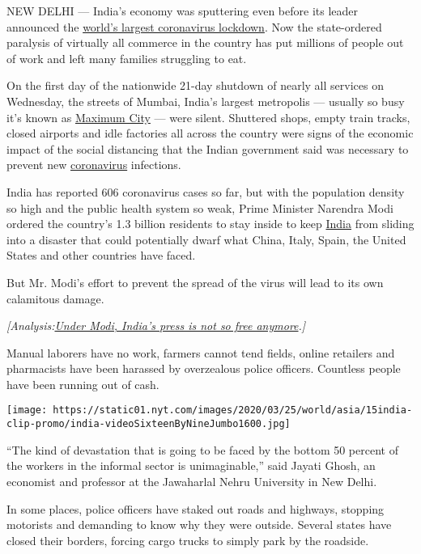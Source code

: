 NEW DELHI --- India's economy was sputtering even before its leader
announced the
\href{https://www.nytimes.com/2020/03/24/world/asia/india-coronavirus-lockdown.html}{world's
largest coronavirus lockdown}. Now the state-ordered paralysis of
virtually all commerce in the country has put millions of people out of
work and left many families struggling to eat.

On the first day of the nationwide 21-day shutdown of nearly all
services on Wednesday, the streets of Mumbai, India's largest metropolis
--- usually so busy it's known as
\href{https://www.penguinrandomhouse.com/books/112973/maximum-city-by-suketu-mehta/}{Maximum
City} --- were silent. Shuttered shops, empty train tracks, closed
airports and idle factories all across the country were signs of the
economic impact of the social distancing that the Indian government said
was necessary to prevent new
\href{https://www.nytimes.com/2020/04/28/world/asia/india-coronavirus-lockdown.html}{coronavirus}
infections.

India has reported 606 coronavirus cases so far, but with the population
density so high and the public health system so weak, Prime Minister
Narendra Modi ordered the country's 1.3 billion residents to stay inside
to keep
\href{https://www.nytimes.com/2020/04/28/world/asia/india-coronavirus-lockdown.html}{India}
from sliding into a disaster that could potentially dwarf what China,
Italy, Spain, the United States and other countries have faced.

But Mr. Modi's effort to prevent the spread of the virus will lead to
its own calamitous damage.

\emph{{[}Analysis:}\href{http://www.nytimes.com/2020/04/02/world/asia/modi-india-press-media.html}{\emph{Under
Modi, India's press is not so free anymore}}\emph{.{]}}

Manual laborers have no work, farmers cannot tend fields, online
retailers and pharmacists have been harassed by overzealous police
officers. Countless people have been running out of cash.

\texttt{[image: https://static01.nyt.com/images/2020/03/25/world/asia/15india-clip-promo/india-videoSixteenByNineJumbo1600.jpg]}

``The kind of devastation that is going to be faced by the bottom 50
percent of the workers in the informal sector is unimaginable,'' said
Jayati Ghosh, an economist and professor at the Jawaharlal Nehru
University in New Delhi.

In some places, police officers have staked out roads and highways,
stopping motorists and demanding to know why they were outside. Several
states have closed their borders, forcing cargo trucks to simply park by
the roadside.

